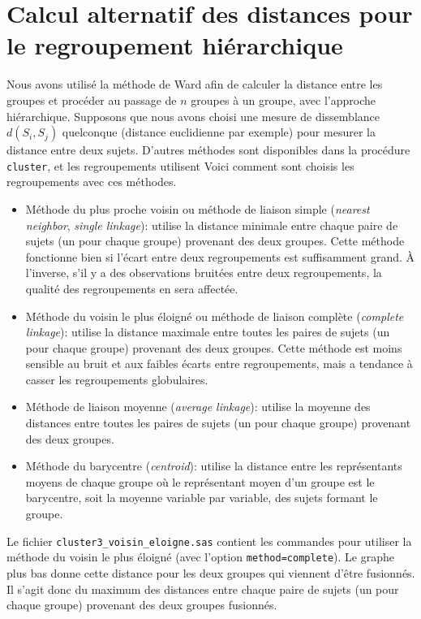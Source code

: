 \documentclass[
  11pt,
  letterpaper,
]{book}
\providecommand{\tightlist}{%
  \setlength{\itemsep}{0pt}\setlength{\parskip}{0pt}}
\theoremstyle{definition}
\theoremstyle{definition}
\theoremstyle{definition}
\theoremstyle{remark}
\begin{document}
\hypertarget{calcul-alternatif-des-distances-pour-le-regroupement-hiuxe9rarchique}{%
\section{Calcul alternatif des distances pour le regroupement hiérarchique}\label{calcul-alternatif-des-distances-pour-le-regroupement-hiuxe9rarchique}}

Nous avons utilisé la méthode de Ward afin de calculer la distance entre les groupes et procéder au passage de \(n\) groupes à un groupe, avec l'approche hiérarchique. Supposons que nous avons choisi une mesure de dissemblance \(d(S_i, S_j)\) quelconque (distance euclidienne par exemple) pour mesurer la distance entre deux sujets. D'autres méthodes sont disponibles dans la procédure \texttt{cluster}, et les regroupements utilisent
Voici comment sont choisis les regroupements avec ces méthodes.

\begin{itemize}
\tightlist
\item
  Méthode du plus proche voisin ou méthode de liaison simple (\emph{nearest neighbor}, \emph{single linkage}): utilise la distance minimale entre chaque paire de sujets (un pour chaque groupe) provenant des deux groupes. Cette méthode fonctionne bien si l'écart entre deux regroupements est suffisamment grand. À l'inverse, s'il y a des observations bruitées entre deux regroupements, la qualité des regroupements en sera affectée.
\item
  Méthode du voisin le plus éloigné ou méthode de liaison complète (\emph{complete linkage}): utilise la distance maximale entre toutes les paires de sujets (un pour chaque groupe) provenant des deux groupes. Cette méthode est moins sensible au bruit et aux faibles écarts entre regroupements, mais a tendance à casser les regroupements globulaires.
\item
  Méthode de liaison moyenne (\emph{average linkage}): utilise la moyenne des distances entre toutes les paires de sujets (un pour chaque groupe) provenant des deux groupes.
\item
  Méthode du barycentre (\emph{centroid}): utilise la distance entre les représentants moyens de chaque groupe où le représentant moyen d'un groupe est le barycentre, soit la moyenne variable par variable, des sujets formant le groupe.
\end{itemize}

Le fichier \texttt{cluster3\_voisin\_eloigne.sas} contient les commandes pour utiliser la méthode du voisin le plus éloigné (avec l'option \texttt{method=complete}). Le graphe plus bas donne cette distance pour les deux groupes qui viennent d'être fusionnés. Il s'agit donc du maximum des distances entre chaque paire de sujets (un pour chaque groupe) provenant des deux groupes fusionnés.
\end{document}
